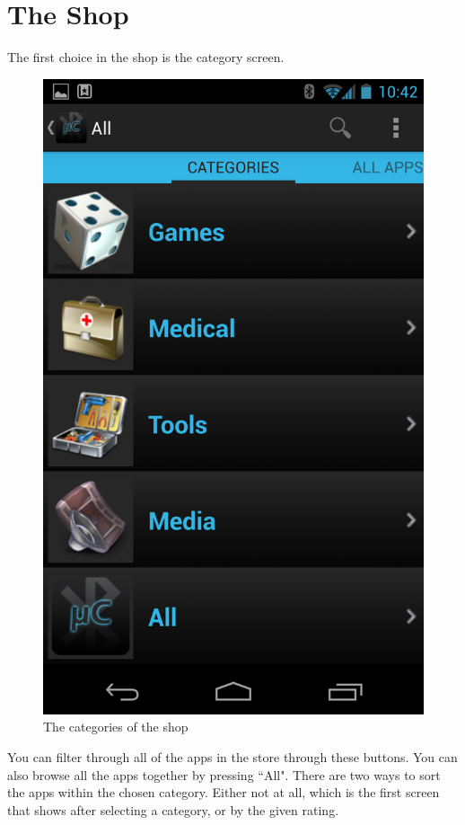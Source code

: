 \chapter{The Shop}
The first choice in the shop is the category screen.\\
\newline
\begin{figure}[H]
	\centering
	\includegraphics[scale = 0.3]{images/Screenshots/category_view.png}
	\caption{The categories of the shop}
\end{figure}
You can filter through all of the apps in the store through these buttons. You can also browse all the apps together by pressing ``All". There are two ways to sort the apps within the chosen category. Either not at all, which is the first screen that shows after selecting a category, or by the given rating. \\
